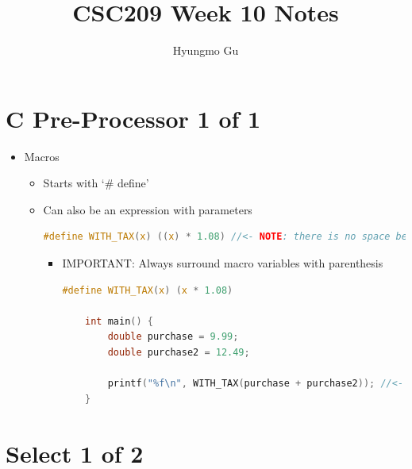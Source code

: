 \documentclass[12pt]{article}
\begin{document}
\title{CSC209 Week 10 Notes}
\author{Hyungmo Gu}
\maketitle

\section*{C Pre-Processor 1 of 1}

\bigskip

\begin{itemize}
    \item Macros
    \begin{itemize}
        \item Starts with `\# define'
        \item Can also be an expression with parameters

    \begin{lstlisting}[language=c]
    #define WITH_TAX(x) ((x) * 1.08) //<- NOTE: there is no space between WITH_TAX and (x)
    \end{lstlisting}

        \begin{itemize}
            \item IMPORTANT: Always surround macro variables with parenthesis
    \begin{lstlisting}[language=c, caption={macros\_example\_1.c}]
    #define WITH_TAX(x) (x * 1.08)

    int main() {
        double purchase = 9.99;
        double purchase2 = 12.49;

        printf("%f\n", WITH_TAX(purchase + purchase2)); //<- will result in purchase + purchase2 * 1.08.
    }
    \end{lstlisting}
        \end{itemize}


    \end{itemize}
\end{itemize}

\bigskip

\section*{Select 1 of 2}

\bigskip
\end{document}
